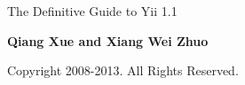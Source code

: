 
\thispagestyle{empty}
\begin{center}
    \bfseries \rule{0cm}{1.5cm} \Huge
    The Definitive Guide to Yii 1.1
     \vspace{1.5cm}
\end{center}

\begin{center}
    \bfseries \Large Qiang Xue and Xiang Wei Zhuo
\end{center}


\begin{center}
   Copyright 2008-2013. All Rights Reserved.
\end{center}

\vfill

\pagebreak \thispagestyle{empty} \cleardoublepage
